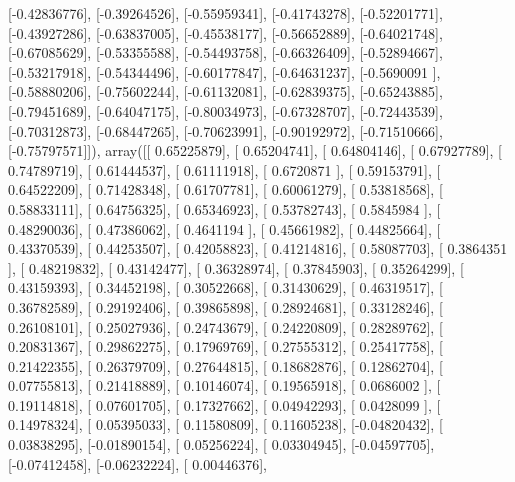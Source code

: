 \documentclass{article}
\begin{document}
       [-0.42836776],
       [-0.39264526],
       [-0.55959341],
       [-0.41743278],
       [-0.52201771],
       [-0.43927286],
       [-0.63837005],
       [-0.45538177],
       [-0.56652889],
       [-0.64021748],
       [-0.67085629],
       [-0.53355588],
       [-0.54493758],
       [-0.66326409],
       [-0.52894667],
       [-0.53217918],
       [-0.54344496],
       [-0.60177847],
       [-0.64631237],
       [-0.5690091 ],
       [-0.58880206],
       [-0.75602244],
       [-0.61132081],
       [-0.62839375],
       [-0.65243885],
       [-0.79451689],
       [-0.64047175],
       [-0.80034973],
       [-0.67328707],
       [-0.72443539],
       [-0.70312873],
       [-0.68447265],
       [-0.70623991],
       [-0.90192972],
       [-0.71510666],
       [-0.75797571]]), array([[ 0.65225879],
       [ 0.65204741],
       [ 0.64804146],
       [ 0.67927789],
       [ 0.74789719],
       [ 0.61444537],
       [ 0.61111918],
       [ 0.6720871 ],
       [ 0.59153791],
       [ 0.64522209],
       [ 0.71428348],
       [ 0.61707781],
       [ 0.60061279],
       [ 0.53818568],
       [ 0.58833111],
       [ 0.64756325],
       [ 0.65346923],
       [ 0.53782743],
       [ 0.5845984 ],
       [ 0.48290036],
       [ 0.47386062],
       [ 0.4641194 ],
       [ 0.45661982],
       [ 0.44825664],
       [ 0.43370539],
       [ 0.44253507],
       [ 0.42058823],
       [ 0.41214816],
       [ 0.58087703],
       [ 0.3864351 ],
       [ 0.48219832],
       [ 0.43142477],
       [ 0.36328974],
       [ 0.37845903],
       [ 0.35264299],
       [ 0.43159393],
       [ 0.34452198],
       [ 0.30522668],
       [ 0.31430629],
       [ 0.46319517],
       [ 0.36782589],
       [ 0.29192406],
       [ 0.39865898],
       [ 0.28924681],
       [ 0.33128246],
       [ 0.26108101],
       [ 0.25027936],
       [ 0.24743679],
       [ 0.24220809],
       [ 0.28289762],
       [ 0.20831367],
       [ 0.29862275],
       [ 0.17969769],
       [ 0.27555312],
       [ 0.25417758],
       [ 0.21422355],
       [ 0.26379709],
       [ 0.27644815],
       [ 0.18682876],
       [ 0.12862704],
       [ 0.07755813],
       [ 0.21418889],
       [ 0.10146074],
       [ 0.19565918],
       [ 0.0686002 ],
       [ 0.19114818],
       [ 0.07601705],
       [ 0.17327662],
       [ 0.04942293],
       [ 0.0428099 ],
       [ 0.14978324],
       [ 0.05395033],
       [ 0.11580809],
       [ 0.11605238],
       [-0.04820432],
       [ 0.03838295],
       [-0.01890154],
       [ 0.05256224],
       [ 0.03304945],
       [-0.04597705],
       [-0.07412458],
       [-0.06232224],
       [ 0.00446376],
\end{document}
